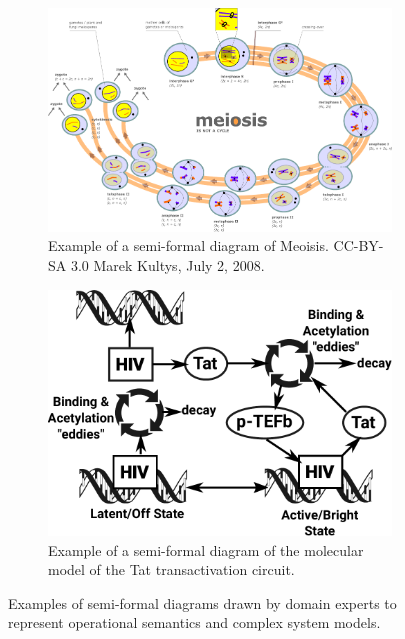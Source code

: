 \documentclass[11pt]{article}
\begin{document}
\begin{figure}
  \centering
  \begin{subfigure}[b]{0.48\textwidth}
    \includegraphics[width=\textwidth]{figs/Diagram_of_meiosis.pdf}
    \caption{Example of a semi-formal diagram of Meoisis. CC-BY-SA 3.0 Marek Kultys, July 2, 2008.}
    \label{Fig:Meiosis}
  \end{subfigure}
  \begin{subfigure}[b]{0.48\textwidth}
    \includegraphics[width=\textwidth]{figs/HIV-Tat-figure.pdf}
    \caption{Example of a semi-formal diagram of the molecular model of the Tat transactivation circuit.}
    \label{Fig:HIV-Tat}
  \end{subfigure}
  \caption{Examples of semi-formal diagrams drawn by domain experts to represent operational semantics and complex
  system models.}
  \label{Fig:Semi-formal}
\end{figure}
\end{document}

